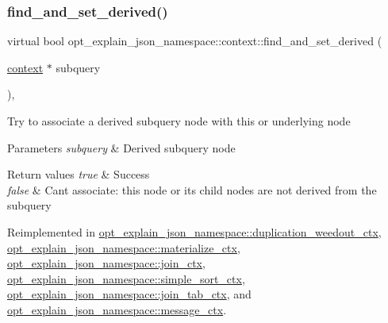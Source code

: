 \mbox{\label{classopt__explain__json__namespace_1_1context_afe66d6ec1a0f56114bc2b493b084c1a0}} 
\subsubsection{\texorpdfstring{find\+\_\+and\+\_\+set\+\_\+derived()}{find\_and\_set\_derived()}}
{\footnotesize\ttfamily virtual bool opt\+\_\+explain\+\_\+json\+\_\+namespace\+::context\+::find\+\_\+and\+\_\+set\+\_\+derived (\begin{DoxyParamCaption}\item[{\mbox{\hyperlink{classopt__explain__json__namespace_1_1context}{context}} $\ast$}]{subquery }\end{DoxyParamCaption})\hspace{0.3cm}{\ttfamily [inline]}, {\ttfamily [virtual]}}

Try to associate a derived subquery node with this or underlying node


\begin{DoxyParams}{Parameters}
{\em subquery} & Derived subquery node\\
\hline
\end{DoxyParams}

\begin{DoxyRetVals}{Return values}
{\em true} & Success \\
\hline
{\em false} & Can\textquotesingle{}t associate\+: this node or its child nodes are not derived from the subquery \\
\hline
\end{DoxyRetVals}


Reimplemented in \mbox{\hyperlink{classopt__explain__json__namespace_1_1duplication__weedout__ctx_a2ff1982ca0d17cea2655f6273c229dd7}{opt\+\_\+explain\+\_\+json\+\_\+namespace\+::duplication\+\_\+weedout\+\_\+ctx}}, \mbox{\hyperlink{classopt__explain__json__namespace_1_1materialize__ctx_a907eb60c00dc90af2832012bfed3bb1e}{opt\+\_\+explain\+\_\+json\+\_\+namespace\+::materialize\+\_\+ctx}}, \mbox{\hyperlink{classopt__explain__json__namespace_1_1join__ctx_aa37b36787c204c852a8d7578459cfbc0}{opt\+\_\+explain\+\_\+json\+\_\+namespace\+::join\+\_\+ctx}}, \mbox{\hyperlink{classopt__explain__json__namespace_1_1simple__sort__ctx_ae6d87919605c73b23b177c042b0935be}{opt\+\_\+explain\+\_\+json\+\_\+namespace\+::simple\+\_\+sort\+\_\+ctx}}, \mbox{\hyperlink{classopt__explain__json__namespace_1_1join__tab__ctx_afc798daee06122e7680cd80245fdf54d}{opt\+\_\+explain\+\_\+json\+\_\+namespace\+::join\+\_\+tab\+\_\+ctx}}, and \mbox{\hyperlink{classopt__explain__json__namespace_1_1message__ctx_a5929254898f69f30b19b4f176a71e3a1}{opt\+\_\+explain\+\_\+json\+\_\+namespace\+::message\+\_\+ctx}}.

